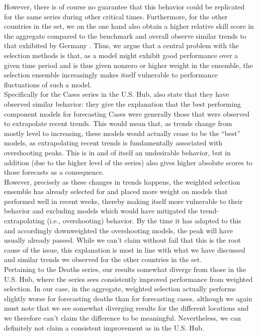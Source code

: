 However, there is of course no guarantee that this behavior could be replicated for the same series during other critical times. Furthermore, for the other countries in the set, we on the one hand also obtain a higher relative skill score in the aggregate compared to the benchmark and overall observe similar trends to that exhibited by Germany . Thus, we argue that a central problem with the selection methods is that, as a model might exhibit good performance over a given time period and is thus given nonzero or higher weight in the ensemble, the selection ensemble increasingly makes itself vulnerable to performance fluctuations of such a model.\\ 
Specifically for the Cases series in the U.S. Hub, \cite{ray_comparing_2022} also state that they have observed similar behavior: they give the explanation that the best performing component models for forecasting Cases were generally those that were observed to extrapolate recent trends. This would mean that, as trends change from mostly level to increasing, these models would actually cease to be the ``best'' models, as extrapolating recent trends is fundamentally associated with overshooting peaks. This is in and of itself an undesirable behavior, but in addition (due to the higher level of the series) also gives higher absolute scores to those forecasts as a consequence.\\
However, precisely as these changes in trends happens, the weighted selection ensemble has already selected for and placed more weight on models that performed well in recent weeks, thereby making itself more vulnerable to their behavior and excluding models which would have mitigated the trend-extrapolating (i.e., overshooting) behavior. By the time it has adapted to this and accordingly downweighted the overshooting models, the peak will have usually already passed. While we can't claim without fail that this is the root cause of the issue, this explanation is most in line with what we have discussed and similar trends we observed for the other countries in the set.\medskip\\
Pertaining to the Deaths series, our results somewhat diverge from those in the U.S. Hub, where the series sees consistently improved performance from weighted selection. In our case, in the aggregate, weighted selection actually performs slightly worse for forecasting deaths than for forecasting cases, although we again must note that we see somewhat diverging results for the different locations and we therefore can't claim the difference to be meaningful. Nevertheless, we can definitely not claim a consistent improvement as in the U.S. Hub.\\

